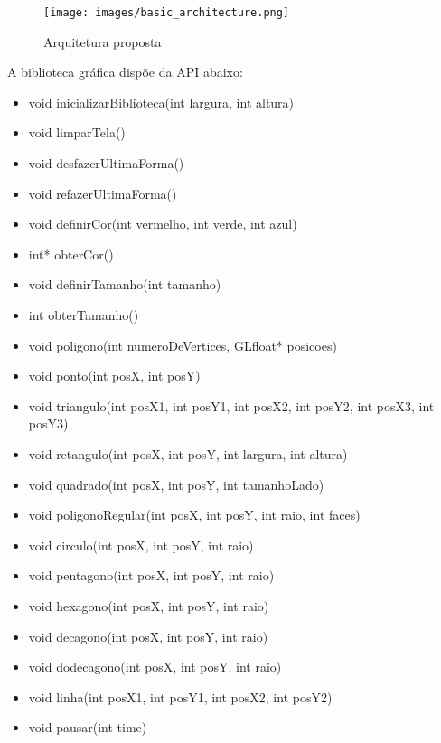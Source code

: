 \documentclass[12pt, %
openright,
oneside, %
a4paper,    %
brazil]{facom-ufu-abntex2}
\begin{document}
\begin{figure}[htbp]
  \centering
  \texttt{[image: images/basic\_architecture.png]}
  \caption{Arquitetura proposta}
  \label{fig:arquitetura_proposta}
\end{figure}

A biblioteca gráfica dispõe da API abaixo:

\begin{itemize}
    \item void inicializarBiblioteca(int largura, int altura)
    \item void limparTela()
    
    \item void desfazerUltimaForma()
    \item void refazerUltimaForma()
    
    \item void definirCor(int vermelho, int verde, int azul)
    \item int* obterCor()
    
    \item void definirTamanho(int tamanho)
    \item int obterTamanho()

    \item void poligono(int numeroDeVertices, GLfloat* posicoes)
    \item void ponto(int posX, int posY)
    \item void triangulo(int posX1, int posY1, int posX2, int posY2, int posX3, int posY3)
    \item void retangulo(int posX, int posY, int largura, int altura)
    \item void quadrado(int posX, int posY, int tamanhoLado)
    \item void poligonoRegular(int posX, int posY, int raio, int faces)
    \item void circulo(int posX, int posY, int raio)
    \item void pentagono(int posX, int posY, int raio)
    \item void hexagono(int posX, int posY, int raio)
    \item void decagono(int posX, int posY, int raio)
    \item void dodecagono(int posX, int posY, int raio)
    \item void linha(int posX1, int posY1, int posX2, int posY2)
    
    \item void pausar(int time)
\end{itemize}
\end{document}
